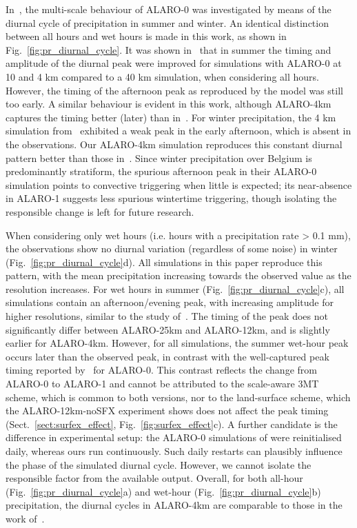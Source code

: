 \documentclass[journal abbreviation, manuscript]{copernicus}
\begin{document}
In~\citet{de_troch_application_2016}, the multi-scale behaviour of ALARO-0 was investigated by means of the diurnal cycle of precipitation in summer and winter.
An identical distinction between all hours and wet hours is made in this work, as shown in Fig.~\ref{fig:pr_diurnal_cycle}. 
It was shown in~\citet{de_troch_application_2016} that in summer the timing and amplitude of the diurnal peak were improved for simulations with ALARO-0 at 10 and 4 km compared to a 40 km simulation, when considering all hours. 
However, the timing of the afternoon peak as reproduced by the model was still too early. 
A similar behaviour is evident in this work, although ALARO-4km captures the timing better (later) than in~\citet{de_troch_application_2016}.
For winter precipitation, the 4 km simulation from~\citet{de_troch_application_2016} exhibited a weak peak in the early afternoon, which is absent in the observations. 
Our ALARO-4km simulation reproduces this constant diurnal pattern better than those in~\citet{de_troch_application_2016}.
Since winter precipitation over Belgium is predominantly stratiform, the spurious afternoon peak in their ALARO-0 simulation points to convective triggering when little is expected; its near-absence in ALARO-1 suggests less spurious wintertime triggering, though isolating the responsible change is left for future research.

When considering only wet hours (i.e. hours with a precipitation rate > 0.1 mm), the observations show no diurnal variation (regardless of some noise) in winter (Fig.~\ref{fig:pr_diurnal_cycle}d). 
All simulations in this paper reproduce this pattern, with the mean precipitation increasing towards the observed value as the resolution increases.
For wet hours in summer (Fig.~\ref{fig:pr_diurnal_cycle}c), all simulations contain an afternoon/evening peak, with increasing amplitude for higher resolutions, similar to the study of~\citet{de_troch_application_2016}. 
The timing of the peak does not significantly differ between ALARO-25km and ALARO-12km, and is slightly earlier for ALARO-4km. 
However, for all simulations, the summer wet-hour peak occurs later than the observed peak, in contrast with the well-captured peak timing reported by~\citet{de_troch_application_2016} for ALARO-0.
This contrast reflects the change from ALARO-0 to ALARO-1 and cannot be attributed to the scale-aware 3MT scheme, which is common to both versions, nor to the land-surface scheme, which the ALARO-12km-noSFX experiment shows does not affect the peak timing (Sect.~\ref{sect:surfex_effect}, Fig.~\ref{fig:surfex_effect}c). 
A further candidate is the difference in experimental setup: the ALARO-0 simulations of \citet{de_troch_application_2016} were reinitialised daily, whereas ours run continuously.
Such daily restarts can plausibly influence the phase of the simulated diurnal cycle.
However, we cannot isolate the responsible factor from the available output.
Overall, for both all-hour (Fig.~\ref{fig:pr_diurnal_cycle}a) and wet-hour (Fig.~\ref{fig:pr_diurnal_cycle}b) precipitation, the diurnal cycles in ALARO-4km are comparable to those in the work of~\citet{de_troch_application_2016}.
\end{document}
